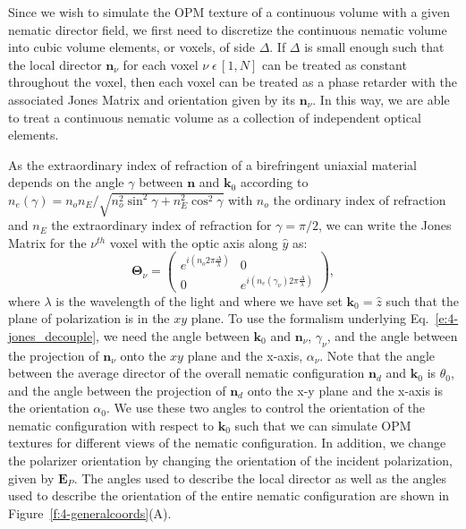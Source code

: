 Since we wish to simulate the OPM texture of a continuous volume with a given nematic director field, we first need to discretize the continuous nematic volume into cubic volume elements, or voxels, of side $\Delta$.
If $\Delta$ is small enough such that the local director $\mathbf{n}_{\nu}$ for each voxel $ \nu \;\epsilon \, [1,N]$ can be treated as constant throughout the voxel, then each voxel can be treated as a phase retarder with the associated Jones Matrix and orientation given by its $\mathbf{n}_{\nu}$.
In this way, we are able to treat a continuous nematic volume as a collection of independent optical elements.

As the extraordinary index of refraction of a birefringent uniaxial material depends on the angle $\gamma$ between $\mathbf{n}$ and $\mathbf{k}_0$ according to $n_e(\gamma) = n_o n_E/\sqrt{n^2_o \sin^2\gamma+n_E^2 \cos^2 \gamma}$ with $n_o$ the ordinary index of refraction and $n_E$ the extraordinary index of refraction for $\gamma = \pi/2$, we can write the Jones Matrix for the $\nu^{th}$ voxel with the optic axis along $\hat{y}$ as:
\begin{equation}
\bm{\Theta}_{\nu}  =  \begin{pmatrix}e^{i(n_o2 \pi \frac{\Delta}{\lambda})} & 0 \\ 0 & e^{i (n_e(\gamma_{\nu})2 \pi \frac{\Delta}{\lambda})} \end{pmatrix},
\end{equation}
where $\lambda$ is the wavelength of the light and where we have set $\mathbf{k}_0=\hat{z}$ such that the plane of polarization is in the $xy$ plane.
To use the formalism underlying Eq.~\ref{e:4-jones_decouple}, we need the angle between $\mathbf{k}_0$ and $\mathbf{n}_{\nu}$, $\gamma_{\nu}$, and the angle between the projection of $\mathbf{n}_{\nu}$ onto the $xy$ plane and the x-axis, $\alpha_{\nu}$.
Note that the angle between the average director of the overall nematic configuration $\mathbf{n}_d$ and $\mathbf{k}_0$ is $\theta_0$, and the angle between the projection of $\mathbf{n}_d$ onto the x-y plane and the x-axis is the orientation $\alpha_0$.
We use these two angles to control the orientation of the nematic configuration with respect to $\mathbf{k}_0$ such that we can simulate OPM textures for different views of the nematic configuration.
In addition, we change the polarizer orientation by changing the orientation of the incident polarization, given by $\mathbf{E}_P$.
The angles used to describe the local director as well as the angles used to describe the orientation of the entire nematic configuration are shown in Figure~\ref{f:4-generalcoords}(A).
